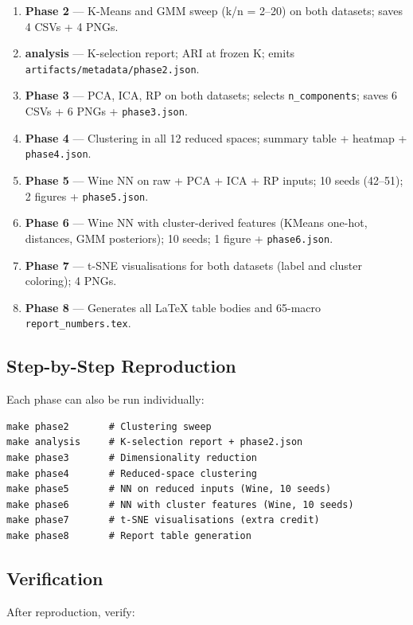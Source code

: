 \documentclass[letterpaper, 11pt]{article}
\begin{document}
\begin{enumerate}
\item \textbf{Phase 2} --- K-Means and GMM sweep (k/n = 2--20) on both datasets; saves 4 CSVs + 4 PNGs.
\item \textbf{analysis} --- K-selection report; ARI at frozen K; emits \texttt{artifacts/metadata/phase2.json}.
\item \textbf{Phase 3} --- PCA, ICA, RP on both datasets; selects \texttt{n\_components}; saves 6 CSVs + 6 PNGs + \texttt{phase3.json}.
\item \textbf{Phase 4} --- Clustering in all 12 reduced spaces; summary table + heatmap + \texttt{phase4.json}.
\item \textbf{Phase 5} --- Wine NN on raw + PCA + ICA + RP inputs; 10 seeds (42--51); 2 figures + \texttt{phase5.json}.
\item \textbf{Phase 6} --- Wine NN with cluster-derived features (KMeans one-hot, distances, GMM posteriors); 10 seeds; 1 figure + \texttt{phase6.json}.
\item \textbf{Phase 7} --- t-SNE visualisations for both datasets (label and cluster coloring); 4 PNGs.
\item \textbf{Phase 8} --- Generates all LaTeX table bodies and 65-macro \texttt{report\_numbers.tex}.
\end{enumerate}

\subsection{Step-by-Step Reproduction}

Each phase can also be run individually:

\begin{verbatim}
make phase2       # Clustering sweep
make analysis     # K-selection report + phase2.json
make phase3       # Dimensionality reduction
make phase4       # Reduced-space clustering
make phase5       # NN on reduced inputs (Wine, 10 seeds)
make phase6       # NN with cluster features (Wine, 10 seeds)
make phase7       # t-SNE visualisations (extra credit)
make phase8       # Report table generation
\end{verbatim}

\subsection{Verification}

After reproduction, verify:
\end{document}
